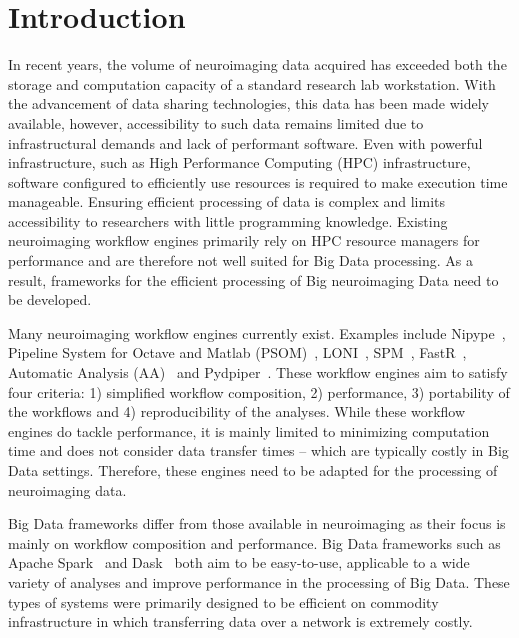     \section{Introduction}
        In recent years, the volume of neuroimaging data acquired has exceeded
        both the storage and computation capacity of a standard research 
        lab workstation. With the advancement of data sharing technologies, 
        this data has been made widely available, however, accessibility to 
        such data remains limited due to infrastructural demands and lack of 
        performant software. Even with powerful infrastructure, such as High
        Performance Computing (HPC) infrastructure, software configured to 
        efficiently use resources is required to make execution time manageable. 
        Ensuring efficient processing of data is 
        complex and limits accessibility to researchers with little programming 
        knowledge. Existing neuroimaging workflow engines primarily rely on HPC
        resource managers for performance and are therefore not well suited for
        Big Data processing. As a result, frameworks for the efficient 
        processing of Big neuroimaging Data need to be developed.
        
        Many neuroimaging workflow engines currently exist. Examples include
        Nipype~\cite{nipype}, Pipeline System for Octave and Matlab 
        (PSOM)~\cite{10.3389/fninf.2012.00007}, LONI~\cite{REX20031033}, 
        SPM~\cite{spm}, FastR~\cite{10.3389/fict.2016.00015},
        Automatic Analysis (AA)~\cite{10.3389/fninf.2014.00090} and 
        Pydpiper~\cite{10.3389/fninf.2014.00067}. These 
        workflow engines aim to satisfy four criteria: 1) simplified
        workflow composition, 2) performance, 3) portability of the workflows 
        and 4) reproducibility of the analyses. While these workflow engines
        do tackle performance, it is mainly limited to minimizing computation
        time and does not consider data transfer times -- which are typically
        costly in Big Data settings. Therefore, these engines need to be adapted
        for the processing of neuroimaging data.

        Big Data frameworks differ from those available in neuroimaging as their
        focus is mainly on workflow composition and performance. Big Data 
        frameworks such as Apache Spark~\cite{Zaharia:2016:ASU:3013530.2934664} 
        and Dask~\cite{rocklin2015dask} both aim to be easy-to-use,
        applicable to a wide variety of analyses and improve performance in the 
        processing of Big Data. These types of systems were primarily designed 
        to be efficient on commodity infrastructure in which transferring data
        over a network is extremely costly.

